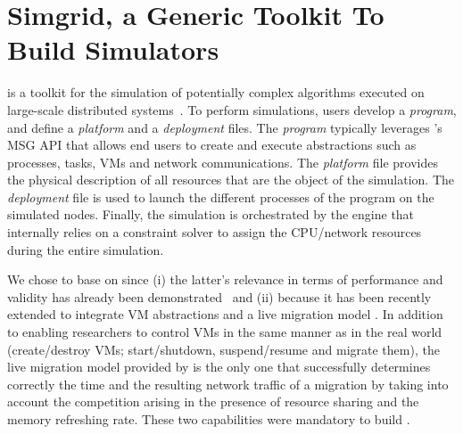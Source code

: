 \section{Simgrid, a Generic Toolkit To Build Simulators}
\label{sec:sg}


\sg is a toolkit for the simulation of potentially complex algorithms
executed on large-scale distributed
systems~\cite{casanova:hal-01017319}.
%
To perform simulations, users develop a \emph{program}, and define a
\emph{platform} and a \emph{deployment} files. The \emph{program}
typically leverages \sg's MSG API that allows end users to create
and execute \sg abstractions such as processes, tasks, VMs and network
communications. The \emph{platform} file provides the physical
description of all resources that are the object of the simulation.
The \emph{deployment} file is used to launch the different \sg
processes of the program on the simulated nodes.
Finally, the simulation is orchestrated by the \sg engine that
internally relies on a constraint solver to assign the CPU/network
resources during the entire
simulation.%


We chose to base \vmps on \sg
since (i) the latter's relevance in terms of performance and validity
has already been demonstrated~\cite{simgridpub} and (ii) because it
has been recently extended to integrate VM abstractions and a live
migration model \cite{Hirofuchi:2013:ALM:2568486.2568524}. In addition
to enabling researchers to control VMs in the same manner as in the
real world (\eg create/destroy VMs; start/shutdown, suspend/resume and
migrate them),
the live migration model provided by \sg  is the only one that successfully determines
correctly the time and the resulting network traffic of a migration by taking into
account the competition arising in the presence of resource sharing
and the memory refreshing rate.
%
These two capabilities were
mandatory to build \vmps.%



